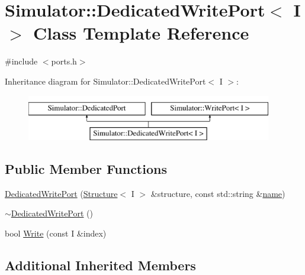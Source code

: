 \hypertarget{class_simulator_1_1_dedicated_write_port}{\section{Simulator\+:\+:Dedicated\+Write\+Port$<$ I $>$ Class Template Reference}
\label{class_simulator_1_1_dedicated_write_port}
}


{\ttfamily \#include $<$ports.\+h$>$}

Inheritance diagram for Simulator\+:\+:Dedicated\+Write\+Port$<$ I $>$\+:\begin{figure}[H]
\begin{center}
\leavevmode
\includegraphics[height=2.000000cm]{class_simulator_1_1_dedicated_write_port}
\end{center}
\end{figure}
\subsection*{Public Member Functions}
\begin{DoxyCompactItemize}
\item 
\hyperlink{class_simulator_1_1_dedicated_write_port_ac3080c4f35eab1600110f500e9e33f92}{Dedicated\+Write\+Port} (\hyperlink{singleton_simulator_1_1_structure}{Structure}$<$ I $>$ \&structure, const std\+::string \&\hyperlink{mtconf_8c_a8f8f80d37794cde9472343e4487ba3eb}{name})
\item 
\hyperlink{class_simulator_1_1_dedicated_write_port_a48714636377d0f7ae14a456727a00e9f}{$\sim$\+Dedicated\+Write\+Port} ()
\item 
bool \hyperlink{class_simulator_1_1_dedicated_write_port_a1dacf0904c0a9e8a954f0a7e6d6da0cb}{Write} (const I \&index)
\end{DoxyCompactItemize}
\subsection*{Additional Inherited Members}



